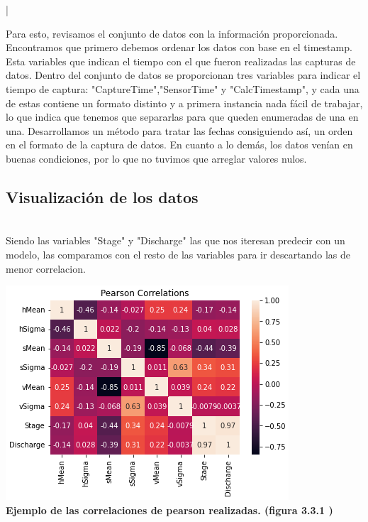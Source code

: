 |\documentclass{article}
\begin{document}
        Para esto, revisamos el conjunto de datos con la información proporcionada. Encontramos que primero debemos ordenar los datos con base en el timestamp. Esta variables que indican el tiempo con el que fueron realizadas las capturas de datos. Dentro del conjunto de datos se proporcionan tres variables para indicar el tiempo de captura: "CaptureTime","SensorTime" y "CalcTimestamp", y cada una de estas contiene un formato distinto y a primera instancia nada fácil de trabajar, lo que indica que tenemos que separarlas para que queden enumeradas de una en una. Desarrollamos un método para tratar las fechas consiguiendo así, un orden en el formato de la captura de datos. En cuanto a lo demás, los datos venían en buenas condiciones, por lo que no tuvimos que arreglar valores nulos. \\

    \subsection{Visualización de los datos}\\

        Siendo las variables "Stage" y "Discharge" las que nos iteresan predecir con un modelo, las comparamos con el resto de las variables para ir descartando las de menor correlacion.

        \begin{center}
            \includegraphics{images/Corr_pearson4.PNG} \\
            
           \textbf{Ejemplo de las correlaciones de pearson realizadas. (figura 3.3.1 )} \\


       \end{center}   
\end{document}
